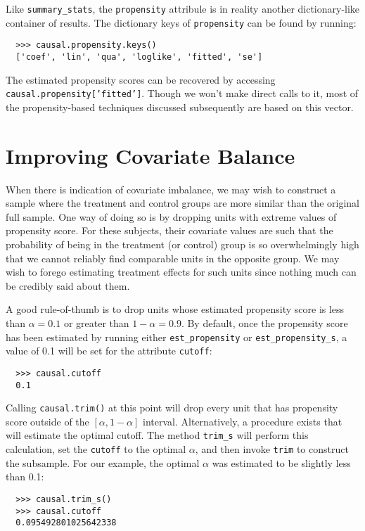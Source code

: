 \documentclass[12pt]{article}
\theoremstyle{definition}
\theoremstyle{definition}
\theoremstyle{definition}
\theoremstyle{remark}
\begin{document}
Like \texttt{summary\_stats}, the \texttt{propensity} attribule is in reality another dictionary-like container of results. The dictionary keys of \texttt{propensity} can be found by running:
\begin{verbatim}
  >>> causal.propensity.keys()
  ['coef', 'lin', 'qua', 'loglike', 'fitted', 'se']
\end{verbatim}
The estimated propensity scores can be recovered by accessing \texttt{causal.propensity['fitted']}. Though we won't make direct calls to it, most of the propensity-based techniques discussed subsequently are based on this vector.

\section*{Improving Covariate Balance}

When there is indication of covariate imbalance, we may wish to construct a sample where the treatment and control groups are more similar than the original full sample. One way of doing so is by dropping units with extreme values of propensity score. For these subjects, their covariate values are such that the probability of being in the treatment (or control) group is so overwhelmingly high that we cannot reliably find comparable units in the opposite group. We may wish to forego estimating treatment effects for such units since nothing much can be credibly said about them.

A good rule-of-thumb is to drop units whose estimated propensity score is less than $\alpha=0.1$ or greater than $1-\alpha=0.9$. By default, once the propensity score has been estimated by running either \texttt{est\_propensity} or \texttt{est\_propensity\_s}, a value of 0.1 will be set for the attribute \texttt{cutoff}:

\begin{verbatim}
  >>> causal.cutoff
  0.1
\end{verbatim}

Calling \texttt{causal.trim()} at this point will drop every unit that has propensity score outside of the $[\alpha, 1-\alpha]$ interval. Alternatively, a procedure exists that will estimate the optimal cutoff. The method \texttt{trim\_s} will perform this calculation, set the \texttt{cutoff} to the optimal $\alpha$, and then invoke \texttt{trim} to construct the subsample. For our example, the optimal $\alpha$ was estimated to be slightly less than 0.1:

\begin{verbatim}
  >>> causal.trim_s()
  >>> causal.cutoff
  0.095492801025642338
\end{verbatim}
\end{document}
